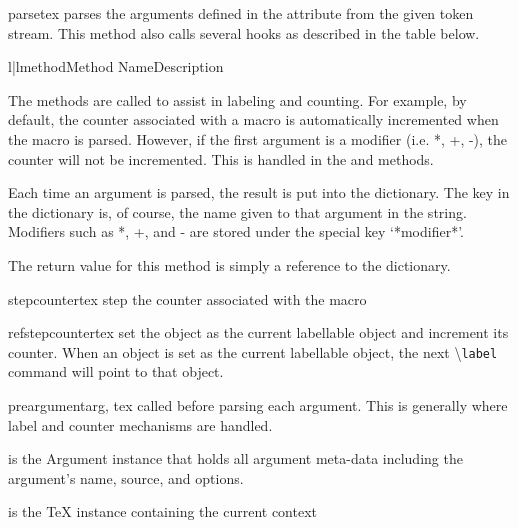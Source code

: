 \documentclass{manual}
\newcommand{\macro}[1]{\textbackslash\texttt{#1}}
\begin{document}
\begin{methoddesc}[Macro]{parse}{tex}
parses the arguments defined in the  attribute from the given
token stream.  This method also calls several hooks as described in the table
below.

\begin{tableii}{l|l}{method}{Method Name}{Description}
\end{tableii}

The methods are called to assist in labeling and counting.  For example,
by default, the counter associated with a macro is automatically incremented
when the macro is parsed.  However, if the first argument is a modifier 
(i.e. *, +, -), the counter will not be incremented.  This is handled 
in the  and  methods.

Each time an argument is parsed, the result is put into the 
dictionary.  The key in the dictionary is, of course, the name given to that
argument in the  string.  Modifiers such as *, +, and - are
stored under the special key `*modifier*'.

The return value for this method is simply a reference to the 
 dictionary.

\end{methoddesc}

\begin{methoddesc}[Macro]{stepcounter}{tex}
step the counter associated with the macro
\end{methoddesc}

\begin{methoddesc}[Macro]{refstepcounter}{tex}
set the object as the current labellable object and increment its counter.
When an object is set as the current labellable object, the next 
\macro{label} command will point to that object.
\end{methoddesc}

\begin{methoddesc}[Macro]{preargument}{arg, tex}
called before parsing each argument.  This is generally where label and
counter mechanisms are handled.

 is the Argument instance that holds all argument meta-data
    including the argument's name, source, and options.

 is the TeX instance containing the current context 
\end{methoddesc}
\end{document}
